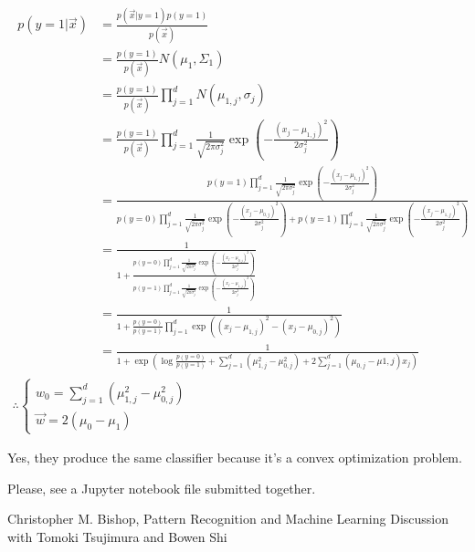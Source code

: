 \documentclass{introtosml}
\newcommand{\x}{\vec{x}}
\newcommand{\w}{\vec{w}}
\newcommand\expp[1]{\exp\left(#1\right)}
\newcommand\gauss[1]{\prod_{j=1}^d \frac{1}{\sqrt{2 \pi \sigma_j^2}} \expp{- \frac{(x_j - \mu_{#1,j})^2}{2 \sigma_j^2}}}
\newcommand\cgauss[1]{p(y=#1)\gauss{#1}}
\newcommand\pbias{\frac{p(y=0)}{p(y=1)}}
\begin{document}
\maketitle

\begin{p}
  \item
    \begin{gather}
      \begin{aligned}
        p(y=1|\x)
        & = \frac{p(\x|y=1)p(y=1)}{p(\x)} \\
        & = \frac{p(y=1)}{p(\x)} N(\mu_1, \Sigma_1) \\
        & = \frac{p(y=1)}{p(\x)} \prod_{j=1}^d N(\mu_{1,j}, \sigma_j) \\
        & = \frac{p(y=1)}{p(\x)} \gauss{1} \\
        & = \frac{\cgauss{1}}{\cgauss{0} + \cgauss{1}} \\
        & = \frac{1}{1 + \frac{\cgauss{0}}{\cgauss{1}}} \\
        & = \frac{1}{1 + \pbias \prod_{j=1}^d \expp{(x_j - \mu_{1,j})^2 - (x_j - \mu_{0,j})^2}} \\
        & = \frac{1}{1 +
            \expp{\log \pbias + \sum_{j=1}^d (\mu_{1,j}^2 - \mu_{0,j}^2)
            + 2 \sum_{j=1}^d (\mu_{0,j} - \mu{1,j}) x_j}}
      \end{aligned} \\
      \therefore \begin{cases}
        w_0 = \sum_{j=1}^d (\mu_{1,j}^2 - \mu_{0,j}^2) \\
        \w = 2 (\mu_0 - \mu_1)
      \end{cases}
    \end{gather}

  \item
    Yes, they produce the same classifier because it's a convex optimization problem.

  \item
    Please, see a Jupyter notebook file submitted together.
\end{p}

\begin{thebibliography}{9}
   Christopher M. Bishop, Pattern Recognition and Machine Learning
   Discussion with Tomoki Tsujimura and Bowen Shi
\end{thebibliography}
\end{document}
